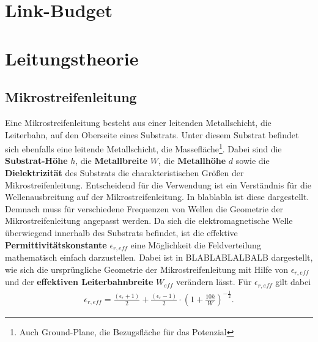 \section{Link-Budget}
\section{Leitungstheorie}
\subsection{Mikrostreifenleitung}
Eine Mikrostreifenleitung besteht aus einer leitenden Metallschicht, die Leiterbahn, auf den Oberseite eines Substrats. Unter diesem Substrat befindet sich ebenfalls eine leitende Metallschicht, die Massefläche\footnote{Auch Ground-Plane, die Bezugsfläche für das Potenzial}. Dabei sind die \textbf{Substrat-Höhe} $h$, die \textbf{Metallbreite} $W$, die \textbf{Metallhöhe} $d$ sowie die \textbf{Dielektrizität} des Substrats die charakteristischen Größen der Mikrostreifenleitung. Entscheidend\cite{TransmissionLineDesignHandbook} für die Verwendung ist ein Verständnis für die Wellenausbreitung auf der Mikrostreifenleitung. In blablabla ist diese dargestellt. Demnach muss für verschiedene Frequenzen von Wellen die Geometrie der Mikrostreifenleitung angepasst werden. Da sich die elektromagnetische Welle überwiegend innerhalb des Substrats befindet, ist die effektive \textbf{Permittivitätskonstante} $\epsilon_{r,eff}$ eine Möglichkeit die Feldverteilung mathematisch einfach darzustellen. Dabei ist in BLABLABLALBALB dargestellt, wie sich die ursprüngliche Geometrie der Mikrostreifenleitung mit Hilfe von $\epsilon_{r,eff}$ und der \textbf{effektiven Leiterbahnbreite} $W_{eff}$ verändern lässt. Für $\epsilon_{r,eff}$ gilt dabei 
\begin{align}
\epsilon_{r,eff} = \frac{\left( \epsilon_{r}+1 \right)}{2} + \frac{\left( \epsilon_{r}-1 \right)}{2} \cdot \left( 1 + \frac{10h}{W}\right)^{-\frac{1}{2}}.
\end{align}




